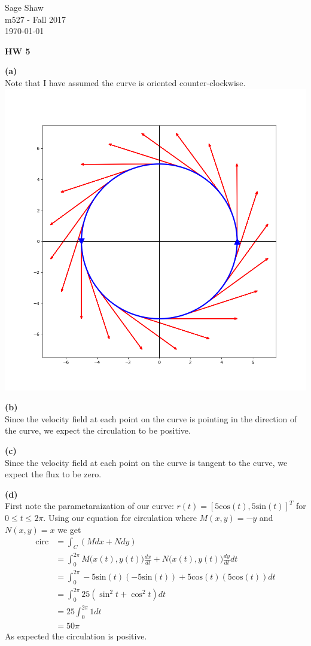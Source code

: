 \documentclass[12pt]{article}
\newcommand{\problem}[1]{\hspace{-4 ex} \large \textbf{#1}\\}
\begin{document}
	\thispagestyle{empty}
	
	\begin{flushright}
		Sage Shaw \\
		m527 - Fall 2017 \\
		\today
	\end{flushright}
	
{\large \textbf{HW 5}}\bigbreak

\problem{(a)}
	Note that I have assumed the curve is oriented counter-clockwise.\\
\includegraphics[width=1.0\textwidth]{hw5_figure_1}


\problem{(b)}
	Since the velocity field at each point on the curve is pointing in the direction of the curve, we expect the circulation to be positive.

\problem{(c)}
	Since the velocity field at each point on the curve is tangent to the curve, we expect the flux to be zero.
	
\problem{(d)}
	First note the parametaraization of our curve: $r(t) = [5\text{cos}(t), 5 \text{sin}(t)]^T$ for $0 \leq t \leq 2\pi$.
	Using our equation for circulation where $M(x,y) = -y$ and $N(x,y) = x$ we get
	\begin{align*}
		\text{circ} & = \int_{C}(Mdx + Ndy) \\
		& = \int_{0}^{2\pi} M\big(x(t),y(t)\big)\tfrac{dx}{dt} + N\big(x(t),y(t)\big) \tfrac{dy}{dt} dt \\
		& = \int_{0}^{2\pi} -5 \text{sin}(t)(-5\text{sin}(t)) + 5\text{cos}(t)(5\text{cos}(t)) dt \\
		& = \int_{0}^{2\pi} 25(\sin^2 t+\cos^2 t) dt \\
		& = 25\int_{0}^{2\pi} 1 dt \\
		& = 50\pi
	\end{align*}
	As expected the circulation is positive.\\
	
\end{document}
